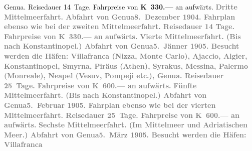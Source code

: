 \begin{ledgroupsized}[t]{13cm}
{{                     Genua. Reisedauer 14 Tage. Fahrpreise von
                     \textbf{K 330.—} an aufwärts.}}\pend
           \pstart
           \textcolor{gray}{\textbf{\textbf{Dritte Mittelmeerfahrt.}
                  Abfahrt von Genua\textbf{8. Dezember 1904}. Fahrplan ebenso wie bei der zweiten Mittelmeerfahrt. Reisedauer 14 Tage. Fahrpreise von \textbf{K 330.—} an aufwärts.}}\pend
           \pstart
           \textcolor{gray}{\textbf{\textbf{Vierte Mittelmeerfahrt.}
                  (Bis nach Konstantinopel.) Abfahrt von Genua\textbf{5. Jänner 1905}. Besucht werden die Häfen: Villafranca
                     (Nizza, Monte Carlo), Ajaccio, Algier, Konstantinopel, Smyrna, Piräus (Athen), Syrakus, Messina, Palermo (Monreale), Neapel (Vesuv, Pompeji etc.), Genua.
                  Reisedauer 25 Tage. Fahrpreise von \textbf{K 600.—} an aufwärts.}}\pend
           \pstart
           \textcolor{gray}{\textbf{\textbf{Fünfte Mittelmeerfahrt.}
                  (Bis nach Konstantinopel.) Abfahrt von Genua\textbf{5. Februar 1905}. Fahrplan ebenso wie bei der vierten Mittelmeerfahrt. Reisedauer 25 Tage. Fahrpreise von \textbf{K 600.—} an aufwärts.}}\pend
           \pstart
           \textcolor{gray}{\textbf{\textbf{Sechste Mittelmeerfahrt.} (Im Mittelmeer und Adriatischen Meer.) Abfahrt von Genua\textbf{5. März 1905}. Besucht werden die Häfen: Villafranca
}}
\end{ledgroupsized}
